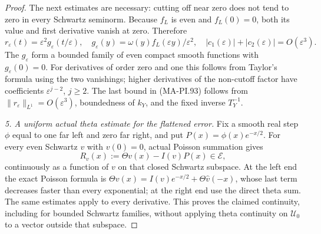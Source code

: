 \begin{proof}
The next estimates are necessary: cutting off near zero
does not tend to zero in every Schwartz seminorm.
Because $f_L$ is even and $f_L(0)=0$, both its value and
first derivative vanish at zero. Therefore
\[
 r_\varepsilon(t)=\varepsilon^2g_\varepsilon(t/\varepsilon),
 \quad g_\varepsilon(y)=\omega(y)
                    f_L(\varepsilon y)/\varepsilon^2,
 \quad |c_1(\varepsilon)|+|c_2(\varepsilon)|=O(\varepsilon^3).
 \tag{MA-PI.93}
\]
The $g_\varepsilon$ form a bounded family of even compact
smooth functions with $g_\varepsilon(0)=0$. For derivatives
of order zero and one this follows from Taylor's formula
using the two vanishings; higher derivatives of the
non-cutoff factor have coefficients $\varepsilon^{j-2}$,
$j\ge2$. The last bound in (MA-PI.93) follows from
$\|r_\varepsilon\|_{L^1}=O(\varepsilon^3)$,
boundedness of $k_Y$, and the fixed inverse $T_Y^{-1}$.

\emph{5. A uniform actual theta estimate for the flattened error.}
Fix a smooth real step $\phi$ equal to one far left and
zero far right, and put $P(x)=\phi(x)e^{-x/2}$.
For every even Schwartz $v$ with $v(0)=0$, actual
Poisson summation gives
\[
 R_v(x):=\Theta v(x)-I(v)P(x)\in\mathcal E,
 \tag{MA-PI.94}
\]
continuously as a function of $v$ on that closed Schwartz
subspace. At the left end the exact Poisson formula is
$\Theta v(x)=I(v)e^{-x/2}+\Theta\widehat v(-x)$,
whose last term decreases faster than every exponential;
at the right end use the direct theta sum. The same
estimates apply to every derivative. This proves the
claimed continuity, including for bounded Schwartz
families, without applying theta continuity on $\mathcal U_0$
to a vector outside that subspace.


\end{proof}
